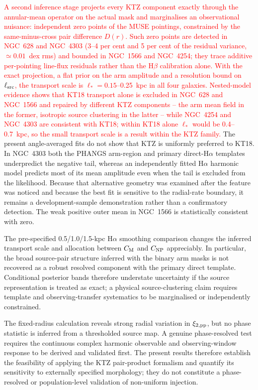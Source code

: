\documentclass[fleqn,usenatbib]{mnras}
\newcommand{\revadd}[1]{\textcolor{red}{#1}}
\begin{document}
\revadd{A second inference stage projects every KTZ component exactly through the annular-mean operator on the actual mask and marginalises an observational nuisance: independent zero points of the MUSE pointings, constrained by the same-minus-cross pair difference $D(r)$.  Such zero points are detected in NGC~628 and NGC~4303 (3--4 per cent and 5 per cent of the residual variance, $\simeq0.01$~dex rms) and bounded in NGC~1566 and NGC~4254; they trace additive per-pointing line-flux residuals rather than the H$\beta$ calibration alone.  With the exact projection, a flat prior on the arm amplitude and a resolution bound on $\ell_{\rm src}$, the transport scale is $\ell_\ast=0.15$--0.25~kpc in all four galaxies.  Nested-model evidence shows that KT18 transport alone is excluded in NGC~628 and NGC~1566 and repaired by different KTZ components -- the arm mean field in the former, isotropic source clustering in the latter -- while NGC~4254 and NGC~4303 are consistent with KT18; within KT18 alone $\ell_\ast$ would be 0.4--0.7~kpc, so the small transport scale is a result within the KTZ family.}  The present angle-averaged fits do not show that KTZ is uniformly preferred to KT18.  In NGC~4303 both the PHANGS arm-region and primary direct-H$\alpha$ templates underpredict the negative tail, whereas an independently fitted H$\alpha$ harmonic model predicts most of its mean amplitude even when the tail is excluded from the likelihood.  Because that alternative geometry was examined after the feature was noticed and because the best fit is sensitive to the radial-rate boundary, it remains a development-sample demonstration rather than a confirmatory detection.  The weak positive outer mean in NGC~1566 is statistically consistent with zero.

The pre-specified 0.5/1.0/1.5-kpc H$\alpha$ smoothing comparison changes the inferred transport scale and allocation between $C_{\rm M}$ and $C_{\rm NP}$ appreciably.  In particular, the broad source-pair structure inferred with the binary arm masks is not recovered as a robust resolved component with the primary direct template.  Conditional posterior bands therefore understate uncertainty if the source representation is treated as exact; a physical source-clustering claim requires template and observing-transfer systematics to be marginalised or independently constrained.

The fixed-radius calculation reveals strong radial variation in $\xi_{2,{\rm pp}}$, but no phase statistic is inferred from a thresholded source map.  A genuine phase-resolved test requires the continuous complex harmonic observable and observing-window response to be derived and validated first.  The present results therefore establish the feasibility of applying the KTZ pair-product formalism and quantify its sensitivity to externally specified morphology; they do not constitute a phase-resolved or population-level validation of non-uniform injection.
\end{document}
